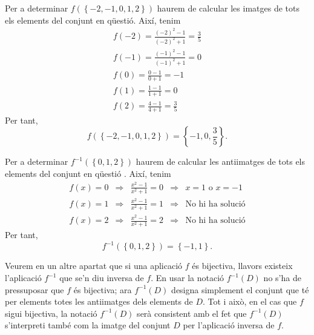 \begin{solucio}
Per a determinar $f\left( \left\{ -2,-1,0,1,2\right\} \right) $ haurem de
calcular les imatges de tots els elements del conjunt en qüestió. Així, tenim%
\begin{equation*}
\begin{array}{c}
f(-2)=\frac{(-2)^{2}-1}{(-2)^{2}+1}=\frac{3}{5} \\
f(-1)=\frac{(-1)^{2}-1}{(-1)^{2}+1}=0 \\
f(0)=\frac{0-1}{0+1}=-1 \\
f(1)=\frac{1-1}{1+1}=0 \\
f(2)=\frac{4-1}{4+1}=\frac{3}{5}%
\end{array}
\end{equation*}
Per tant,%
\begin{equation*}
f\left( \left\{ -2,-1,0,1,2\right\} \right) =\left\{ -1,0,\frac{3}{5}%
\right\} \text{.}
\end{equation*}

Per a determinar $f^{-1}\left( \left\{ 0,1,2\right\} \right) $ haurem de
calcular les antiimatges de tots els elements del conjunt en qüestió%
. Així, tenim%
\begin{equation*}
\begin{array}{ccccc}
f(x)=0 & \Longrightarrow & \frac{x^{2}-1}{x^{2}+1}=0 & \Longrightarrow & x=1%
\text{ o }x=-1 \\
f(x)=1 & \Longrightarrow & \frac{x^{2}-1}{x^{2}+1}=1 & \Longrightarrow &
\text{No hi ha solució} \\
f(x)=2 & \Longrightarrow & \frac{x^{2}-1}{x^{2}+1}=2 & \Longrightarrow &
\text{No hi ha solució}%
\end{array}
\end{equation*}
Per tant,%
\begin{equation*}
f^{-1}\left( \left\{ 0,1,2\right\} \right) =\left\{ -1,1\right\} \text{.}
\end{equation*}
\end{solucio}

\begin{observacio}
Veurem en un altre apartat que si una aplicació $f$ és bijectiva,
llavors existeix l'aplicació $f^{-1}$ que se'n diu inversa de $f$. En
usar la notació $f^{-1}(D)$ no s'ha de pressuposar que $f$ és
bijectiva; ara $f^{-1}(D)$ designa simplement el conjunt que té per
elements totes les antiimatges dels elements de $D$. Tot i això, en el
cas que $f$ sigui bijectiva, la notació $f^{-1}(D)$ serà consistent
amb el fet que $f^{-1}(D)$ s'interpreti també com la imatge del conjunt $%
D$ per l'aplicació inversa de $f$.
\end{observacio}


